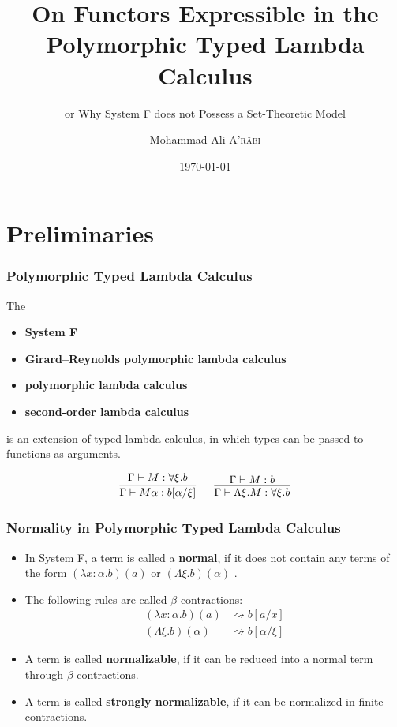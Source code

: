 \documentclass[10pt, compress]{beamer}
\title{On Functors Expressible in the Polymorphic Typed Lambda Calculus}
\subtitle{or Why System F does not Possess a Set-Theoretic Model}
\date{\today}
\author{Mohammad-Ali \textsc{A'r\^abi}}
\institute{Albert-Ludwigs-Universit\"at Freiburg}
\begin{document}
\maketitle

\section{Preliminaries}

\begin{frame}[fragile]
    \frametitle{Polymorphic Typed Lambda Calculus}
  
    The
    \begin{itemize}
        \item \textbf{System F}
        \item \textbf{Girard--Reynolds polymorphic lambda calculus}
        \item \textbf{polymorphic lambda calculus}
        \item \textbf{second-order lambda calculus}
    \end{itemize}
    is an extension of typed lambda calculus, in which types can be passed to functions as arguments.
  
    $$
    \begin{matrix}
    \infer{\Gamma \vdash M\alpha : b[\alpha/\xi]}{\Gamma \vdash M : \forall\xi.b}
    \ &\ 
    \infer{\Gamma \vdash \Lambda\xi. M : \forall\xi.b}{\Gamma \vdash M : b}
    \end{matrix}
    $$
\end{frame}

\begin{frame}[fragile]
    \frametitle{Normality in Polymorphic Typed Lambda Calculus}
  
    \begin{itemize}
        \item In System F, a term is called a \textbf{normal}, if it does not contain any terms of the form $(\lambda x: \alpha. b)(a)$ or $(\Lambda \xi. b)(\alpha)$  \cite{capretta_valentini_1999}.
        \item The following rules are called $\beta$-contractions:
        \begin{align*}
            (\lambda x: \alpha. b)(a) &\rightsquigarrow b [a/x] \\
            (\Lambda \xi. b)(\alpha) &\rightsquigarrow b [\alpha / \xi]
        \end{align*}
        \item A term is called \textbf{normalizable}, if it can be reduced into a normal term through $\beta$-contractions.
        \item A term is called \textbf{strongly normalizable}, if it can be normalized in finite contractions.
    \end{itemize}
\end{frame}
\end{document}
